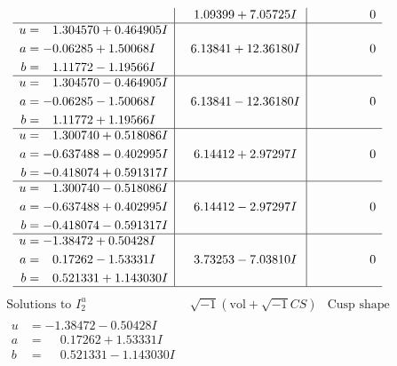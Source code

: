 \documentclass[1p]{elsarticle_modified}
\theoremstyle{definition}
\newcommand{\I}{\sqrt{-1}}
\begin{document}
$$\begin{array}{c|c|c}
 & \phantom{-}1.09399 + 7.05725 I & \phantom{-0.000000 } 0 \\ \hline\begin{aligned}
u &= \phantom{-}1.304570 + 0.464905 I \\
a &= -0.06285 + 1.50068 I \\
b &= \phantom{-}1.11772 - 1.19566 I\end{aligned}
 & \phantom{-}6.13841 + 12.36180 I & \phantom{-0.000000 } 0 \\ \hline\begin{aligned}
u &= \phantom{-}1.304570 - 0.464905 I \\
a &= -0.06285 - 1.50068 I \\
b &= \phantom{-}1.11772 + 1.19566 I\end{aligned}
 & \phantom{-}6.13841 - 12.36180 I & \phantom{-0.000000 } 0 \\ \hline\begin{aligned}
u &= \phantom{-}1.300740 + 0.518086 I \\
a &= -0.637488 - 0.402995 I \\
b &= -0.418074 + 0.591317 I\end{aligned}
 & \phantom{-}6.14412 + 2.97297 I & \phantom{-0.000000 } 0 \\ \hline\begin{aligned}
u &= \phantom{-}1.300740 - 0.518086 I \\
a &= -0.637488 + 0.402995 I \\
b &= -0.418074 - 0.591317 I\end{aligned}
 & \phantom{-}6.14412 - 2.97297 I & \phantom{-0.000000 } 0 \\ \hline\begin{aligned}
u &= -1.38472 + 0.50428 I \\
a &= \phantom{-}0.17262 - 1.53331 I \\
b &= \phantom{-}0.521331 + 1.143030 I\end{aligned}
 & \phantom{-}3.73253 - 7.03810 I & \phantom{-0.000000 } 0\\
 \hline 
 \end{array}$$\newpage$$\begin{array}{c|c|c}  
\text{Solutions to }I^u_{2}& \I (\text{vol} + \sqrt{-1}CS) & \text{Cusp shape}\\
 \hline 
\begin{aligned}
u &= -1.38472 - 0.50428 I \\
a &= \phantom{-}0.17262 + 1.53331 I \\
b &= \phantom{-}0.521331 - 1.143030 I\end{aligned}

\end{array}$$
\end{document}
